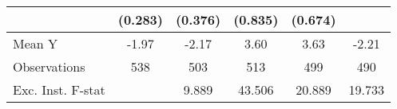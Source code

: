{\begin{tabular}{l*{5}{c}}
            &     (0.283)         &     (0.376)         &     (0.835)         &     (0.674)         &                     \\
\midrule
Mean Y      &       -1.97         &       -2.17         &        3.60         &        3.63         &       -2.21         \\
Observations&         538         &         503         &         513         &         499         &         490         \\
Exc. Inst. F-stat&                     &       9.889         &      43.506         &      20.889         &      19.733         \\
\bottomrule
\end{tabular}
}

